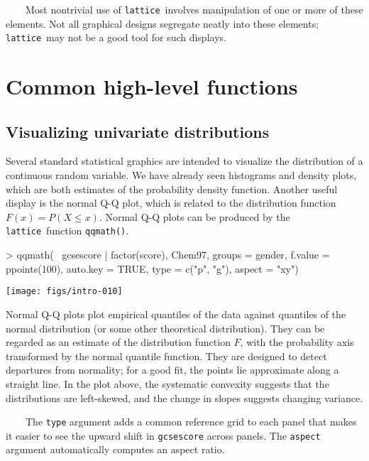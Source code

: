 \documentclass[10pt]{article}
\newcommand{\code}[1]{\texttt{#1}}
\newcommand{\lattice}{\code{lattice}}
\newcommand{\Rfunction}[1]{\code{#1()}}
\begin{document}
~~~~Most nontrivial use of \lattice\ involves manipulation of one or
more of these elements.
Not all graphical designs segregate neatly into these elements;
\lattice\ may not be a good tool for such displays.

\newpage


\section*{Common high-level functions}

\subsection*{Visualizing univariate distributions}


Several standard statistical graphics are intended to visualize the
distribution of a continuous random variable.  We have already seen
histograms and density plots, which are both estimates of the
probability density function.  Another useful display is the normal
Q-Q plot, which is related to the distribution function $F(x) = P(X
\leq x)$.  Normal Q-Q plots can be produced by the \lattice\ function
\Rfunction{qqmath}.
\begin{Schunk}
\begin{Sinput}
> qqmath(~ gcsescore | factor(score), Chem97, groups = gender,
         f.value = ppoints(100), auto.key = TRUE, 
         type = c("p", "g"), aspect = "xy")
\end{Sinput}
\end{Schunk}
\begin{center}
\texttt{[image: figs/intro-010]}
\end{center}
Normal Q-Q plots plot empirical quantiles of the data against
quantiles of the normal distribution (or some other theoretical
distribution).  They can be regarded as an estimate of the
distribution function $F$, with the probability axis transformed by
the normal quantile function.  They are designed to detect departures
from normality; for a good fit, the points lie approximate along a
straight line.  In the plot above, the systematic convexity suggests
that the distributions are left-skewed, and the change in slopes
suggests changing variance.

~~~~The \code{type} argument adds a common reference grid to each
panel that makes it easier to see the upward shift in \code{gcsescore}
across panels.  The \code{aspect} argument automatically computes an
aspect ratio.
\end{document}
